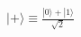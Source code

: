 \documentclass[preview]{standalone}
\begin{document}
\begin{align*}
|+\rangle  \equiv \frac{|0\rangle + |1\rangle}{\sqrt{2}}
\end{align*}
\end{document}

